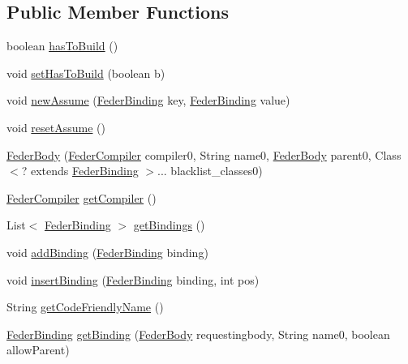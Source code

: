 \subsection*{Public Member Functions}
\begin{DoxyCompactItemize}
\item 
boolean \hyperlink{classfeder_1_1types_1_1FederBody_a8b34fc8b43bba9c859b9e7dc437c3983}{has\+To\+Build} ()
\item 
void \hyperlink{classfeder_1_1types_1_1FederBody_a7368596d9fcc12b30d3c21e69cfee5d6}{set\+Has\+To\+Build} (boolean b)
\item 
void \hyperlink{classfeder_1_1types_1_1FederBody_a38b513fed4f62a653f7dd5a8a8dcca96}{new\+Assume} (\hyperlink{classfeder_1_1types_1_1FederBinding}{Feder\+Binding} key, \hyperlink{classfeder_1_1types_1_1FederBinding}{Feder\+Binding} value)
\item 
void \hyperlink{classfeder_1_1types_1_1FederBody_a2f7b7c8ee314c534f56731e7ee7dbacc}{reset\+Assume} ()
\item 
\hyperlink{classfeder_1_1types_1_1FederBody_a2c3c09316750c434564ad48b7915fe62}{Feder\+Body} (\hyperlink{classfeder_1_1FederCompiler}{Feder\+Compiler} compiler0, String name0, \hyperlink{classfeder_1_1types_1_1FederBody}{Feder\+Body} parent0, Class$<$? extends \hyperlink{classfeder_1_1types_1_1FederBinding}{Feder\+Binding} $>$... blacklist\+\_\+classes0)
\item 
\hyperlink{classfeder_1_1FederCompiler}{Feder\+Compiler} \hyperlink{classfeder_1_1types_1_1FederBody_a1b33bcff46a927796e956f6ded84764d}{get\+Compiler} ()
\item 
List$<$ \hyperlink{classfeder_1_1types_1_1FederBinding}{Feder\+Binding} $>$ \hyperlink{classfeder_1_1types_1_1FederBody_a8e867ab209301d58c984c4e27d324325}{get\+Bindings} ()
\item 
void \hyperlink{classfeder_1_1types_1_1FederBody_a85edfceb1e2b9828d5d6b854a167f221}{add\+Binding} (\hyperlink{classfeder_1_1types_1_1FederBinding}{Feder\+Binding} binding)
\item 
void \hyperlink{classfeder_1_1types_1_1FederBody_a7651c132103a25c4450ccdc3de8df2a3}{insert\+Binding} (\hyperlink{classfeder_1_1types_1_1FederBinding}{Feder\+Binding} binding, int pos)
\item 
String \hyperlink{classfeder_1_1types_1_1FederBody_a8d37894b7118c7cd28dc840703b69fed}{get\+Code\+Friendly\+Name} ()
\item 
\hyperlink{classfeder_1_1types_1_1FederBinding}{Feder\+Binding} \hyperlink{classfeder_1_1types_1_1FederBody_a3102ab9961f4c629236351161c5f4ccc}{get\+Binding} (\hyperlink{classfeder_1_1types_1_1FederBody}{Feder\+Body} requestingbody, String name0, boolean allow\+Parent)

\end{DoxyCompactItemize}
